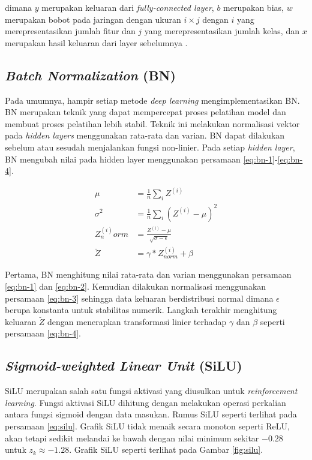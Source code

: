     dimana $y$ merupakan keluaran dari \textit{fully-connected layer}, $b$ merupakan bias, $w$ merupakan bobot pada jaringan dengan ukuran $i\times j$ dengan $i$ yang merepresentasikan jumlah fitur dan $j$ yang merepresentasikan jumlah kelas, dan $x$ merupakan hasil keluaran dari layer sebelumnya \citep{Hafemann2017}.

    \subsection{\textit{Batch Normalization} (BN)}
    Pada umumnya, hampir setiap metode \textit{deep learning} mengimplementasikan BN. BN merupakan teknik yang dapat mempercepat proses pelatihan model dan membuat proses pelatihan lebih stabil. Teknik ini melakukan normalisasi vektor pada \textit{hidden layers} menggunakan rata-rata dan varian. BN dapat dilakukan sebelum atau sesudah menjalankan fungsi non-linier. Pada setiap \textit{hidden layer}, BN mengubah nilai pada hidden layer menggunakan persamaan \ref{eq:bn-1}-\ref{eq:bn-4}.

    \begin{align}
        \label{eq:bn-1}
        \mu &= \frac{1}{n} \sum_i Z^{(i)}\\
        \label{eq:bn-2}
        \sigma^2 &= \frac{1}{n} \sum_i (Z^{(i)}-\mu)^2\\
        \label{eq:bn-3}
        Z^{(i)}_norm &= \frac{Z^{(i)}-\mu}{\sqrt{\sigma-\epsilon}}\\
        \label{eq:bn-4}
        \breve{Z} &= \gamma \ast Z^{(i)}_{norm}+\beta
    \end{align}

    Pertama, BN menghitung nilai rata-rata dan varian menggunakan persamaan \ref{eq:bn-1} dan \ref{eq:bn-2}. Kemudian dilakukan normalisasi menggunakan persamaan \ref{eq:bn-3} sehingga data keluaran berdistribusi normal dimana $\epsilon$ berupa konstanta untuk stabilitas numerik. Langkah terakhir menghitung keluaran $\breve{Z}$ dengan menerapkan transformasi linier terhadap $\gamma$ dan $\beta$ seperti persamaan \ref{eq:bn-4}.

    \subsection{\textit{Sigmoid-weighted Linear Unit} (SiLU)}
    SiLU merupakan salah satu fungsi aktivasi yang diusulkan untuk \textit{reinforcement learning}. Fungsi aktivasi SiLU dihitung dengan melakukan operasi perkalian antara fungsi sigmoid dengan data masukan. Rumus SiLU seperti terlihat pada persamaan \ref{eq:silu}. Grafik SiLU tidak menaik secara monoton seperti ReLU, akan tetapi sedikit melandai ke bawah dengan nilai minimum sekitar $-0.28$ untuk $z_k \approx -1.28$. Grafik SiLU seperti terlihat pada Gambar \ref{fig:silu}.

